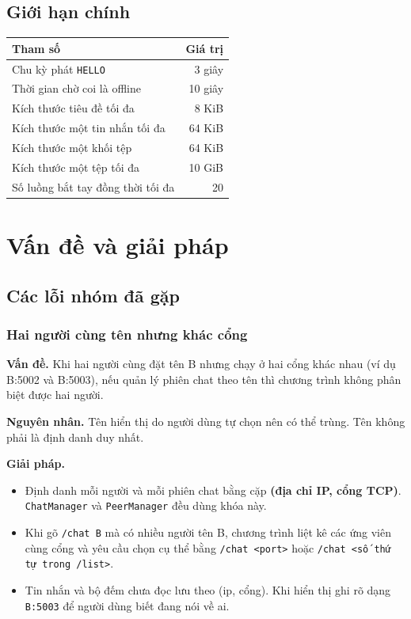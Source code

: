 \documentclass[a4paper,12pt]{article}
\newcommand{\code}[1]{\texttt{#1}}
\begin{document}
\subsection{Giới hạn chính}
\begin{center}
\begin{tabular}{@{}l r@{}}
\toprule
\textbf{Tham số} & \textbf{Giá trị} \\
\midrule
Chu kỳ phát \code{HELLO} & 3 giây \\
Thời gian chờ coi là offline & 10 giây \\
Kích thước tiêu đề tối đa & 8 KiB \\
Kích thước một tin nhắn tối đa & 64 KiB \\
Kích thước một khối tệp & 64 KiB \\
Kích thước một tệp tối đa & 10 GiB \\
Số luồng bắt tay đồng thời tối đa & 20 \\
\bottomrule
\end{tabular}
\end{center}

\section{Vấn đề và giải pháp}

\subsection{Các lỗi nhóm đã gặp}

\subsubsection{Hai người cùng tên nhưng khác cổng}
\textbf{Vấn đề.} Khi hai người cùng đặt tên B nhưng chạy ở hai cổng khác nhau (ví dụ B:5002 và B:5003), nếu quản lý phiên chat theo tên thì chương trình không phân biệt được hai người.

\textbf{Nguyên nhân.} Tên hiển thị do người dùng tự chọn nên có thể trùng. Tên không phải là định danh duy nhất.

\textbf{Giải pháp.}
\begin{itemize}
\item Định danh mỗi người và mỗi phiên chat bằng cặp \textbf{(địa chỉ IP, cổng TCP)}. \code{ChatManager} và \code{PeerManager} đều dùng khóa này.
\item Khi gõ \code{/chat B} mà có nhiều người tên B, chương trình liệt kê các ứng viên cùng cổng và yêu cầu chọn cụ thể bằng \code{/chat <port>} hoặc \code{/chat <số thứ tự trong /list>}.
\item Tin nhắn và bộ đếm chưa đọc lưu theo (ip, cổng). Khi hiển thị ghi rõ dạng \code{B:5003} để người dùng biết đang nói về ai.
\end{itemize}
\end{document}
